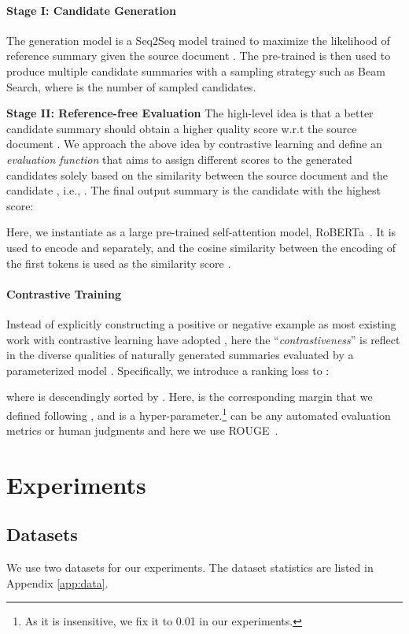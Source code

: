 \documentclass[11pt,a4paper]{article}
\begin{document}
\paragraph{Stage I: Candidate Generation}
The generation model  is a Seq2Seq model trained to maximize the likelihood of reference summary  given the source document .
The pre-trained  is then used to produce multiple candidate summaries  with a sampling strategy such as Beam Search, where  is the number of sampled candidates.

\noindent\textbf{Stage II: Reference-free Evaluation}
The high-level idea is that a better candidate summary  should obtain a higher quality score w.r.t the source document .
We approach the above idea by contrastive learning and define an \textit{evaluation function}
 that aims to assign different scores  to the generated candidates solely based on the similarity between the source document and the candidate , i.e., . 
The final output summary  is the candidate with the highest score:

Here, we instantiate  as a large pre-trained self-attention model, RoBERTa~\citep{DBLP:journals/corr/abs-1907-11692}. 
It is used to encode  and  separately, and the cosine similarity between the encoding of the first tokens is used as the similarity score . 

\paragraph{Contrastive Training}
Instead of explicitly constructing a positive or negative example as most existing work with contrastive learning have adopted \citep{chen2020simple,wu-etal-2020-unsupervised}, here the ``\textit{contrastiveness}'' is reflect in the diverse qualities of naturally generated summaries evaluated by a parameterized model .
Specifically, we introduce a ranking loss to :

where  is descendingly sorted by .
Here,  is the corresponding margin that we defined following \citet{zhong-etal-2020-extractive}, and  is a hyper-parameter.\footnote{As it is insensitive, we fix it to 0.01 in our experiments.}
 can be any automated evaluation metrics or human judgments and here we use ROUGE~\citep{lin-2004-rouge}.

\section{Experiments}

\subsection{Datasets}
We use two datasets for our experiments. 
The dataset statistics are listed in Appendix \ref{app:data}.
\end{document}
